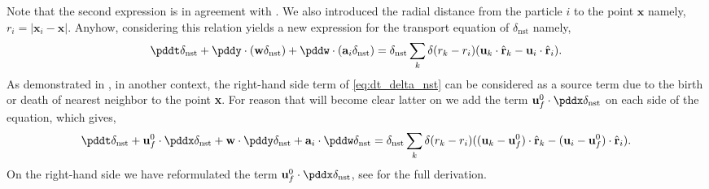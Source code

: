 Note that the second expression is in agreement with \citet[Appendix A]{zhang2021ensemble}. 
We also introduced the radial distance from the particle $i$ to the point $\textbf{x}$ namely, $r_i = |\textbf{x}_i - \textbf{x}|$.  
Anyhow, considering this relation yields a new expression for the transport equation of $\delta_\text{nst}$ namely,
\begin{equation}
    \pddt \delta_\text{nst}
    + \pddy \cdot (\textbf{w} \delta_\text{nst})
    + \pddw \cdot (\textbf{a}_i  \delta_\text{nst})
    = 
    \delta_\text{nst}
    \sum_k 
    \delta(r_k - r_i)
    (\textbf{u}_k  \cdot \hat{\textbf{r}}_k - \textbf{u}_i  \cdot \hat{\textbf{r}}_i). 
\end{equation}
As demonstrated in \citet{zhang2023evolution}, in another context, the right-hand side term of \ref{eq:dt_delta_nst} can be considered as a source term due to the birth or death of nearest neighbor to the point \textbf{x}. 
For reason that will become clear latter on we add the term $\textbf{u}_f^0\cdot \pddx \delta_\text{nst}$ on each side of the equation, which gives,
\begin{equation}
    \pddt \delta_\text{nst}
    + \textbf{u}_f^0\cdot \pddx \delta_\text{nst}
    + \textbf{w}   \cdot \pddy \delta_\text{nst}
    + \textbf{a}_i \cdot \pddw   \delta_\text{nst}
    = 
    \delta_\text{nst}
    \sum_k 
    \delta(r_k - r_i)
    ((\textbf{u}_k - \textbf{u}_f^0) \cdot \hat{\textbf{r}}_k - (\textbf{u}_i  - \textbf{u}_f^0)\cdot \hat{\textbf{r}}_i). 
    \label{eq:dt_delta_nst}
\end{equation}
On the right-hand side we have reformulated the term $\textbf{u}_f^0\cdot \pddx \delta_\text{nst}$, see  for the full derivation. 

